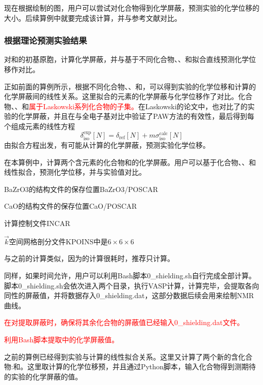 现在根据绘制的图，用户可以尝试对化合物得到化学屏蔽，预测实验的化学位移的大小。后续算例中就要完成该计算，并与参考文献对比。

\subsubsection{根据理论预测实验结果}
对和的初基原胞，计算化学屏蔽，并与基于不同化合物、、和拟合直线预测化学位移作对比。

正如前面的算例所示，根据不同化合物、、和，可以得到实验的化学位移和计算的化学屏蔽间的线性关系。这里拟合的元素的化学屏蔽与化学位移作了对比。化合物、、和\textcolor{red}{属于\textrm{Laskowski}系列化合物的子集。}在\textrm{Laskowski}的论文中，也对比了的实验的化学屏蔽，并且在与全电子基对比中验证了\textrm{PAW}方法的有效性，最后得到每个组成元素的线性方程
\begin{displaymath}
	\delta_{\mathrm{iso}}^{\mathrm{exp}}[N]=\delta_{\mathrm{ref}}[N]+m\sigma_{\mathrm{iso}}^{\mathrm{calc}}[N]
\end{displaymath}
由拟合方程出发，有可能从计算的化学屏蔽，预测实验化学位移。

在本算例中，计算两个含元素的化合物和的化学屏蔽。用户可以基于化合物、、和线性拟合，预测化学位移，并与实验值对比。

\textrm{BaZrO3}的结构文件的保存位置\textrm{BaZrO3/POSCAR}

\textrm{CaO}的结构文件的保存位置\textrm{CaO/POSCAR}

计算控制文件\textrm{INCAR}

$\vec k$空间网格剖分文件\textrm{KPOINS}中是$6\times6\times6$

与之前的计算类似，因为的计算很耗时，推荐只计算。

同样，如果时间允许，用户可以利用\textrm{Bash}脚本\textrm{0\_shielding.sh}自行完成全部计算。脚本\textrm{0\_shielding.sh}会依次进入两个目录，执行\textrm{VASP}计算，计算完毕，会提取各向同性的屏蔽值，并将数据存入\textrm{0\_shielding.dat}，这部分数据后续会用来绘制\textrm{NMR}曲线。

\textcolor{red}{在对提取屏蔽时，确保将其余化合物的屏蔽值已经输入\textrm{0\_shielding.dat}文件。

利用\textrm{Bash}脚本提取中的化学屏蔽值。}

之前的算例已经得到实验与计算的线性拟合关系。这里又计算了两个新的含化合物:和。这里取计算的化学位移预，并且通过\textrm{Python}脚本，输入化合物得到测期待的实验的化学屏蔽的值。

